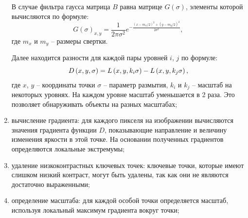 \documentclass[14pt, a4paper]{extreport}
\begin{document}
\begin{enumerate}[label={\arabic*)}]
		В случае фильтра гаусса матрица $B$ равна матрице $G(\sigma)$, элементы которой вычисляются по формуле:
		\begin{equation}
			G(\sigma)_{x,y} = \frac{1}{2\pi\sigma^2}e^{-\frac{(x-m_x/2)^2 + (y-m_y/2)^2}{2\sigma^2}}, 
			\label{eq:G(sigma)}
		\end{equation} 
		где $m_x$ и $m_y$ -- размеры свертки.
		
		Далее находится разности для каждой пары уровней $i$, $j$ по формуле:
		\vspace*{-1.1cm}
		\begin{equation*}
			D\left(x,y,\sigma \right)=L\left(x,y,k_{i}\sigma \right)-L\left(x,y,k_{j}\sigma \right),
			\label{D(x,y,sigma)}
			\vspace*{-0.5cm}
		\end{equation*}
		где $x$, $y$ -- координаты точки $\sigma$ -- параметр размытия, $k_i$ и $k_j$ -- масштаб на некоторых уровнях. На каждом уровне масштаб уменьшается в 2 раза. Это позволяет обнаруживать объекты на разных масштабах;
		
		\item вычисление градиента: для каждого пикселя на изображении вычисляются значения градиента функции $D$, показывающие направление и величину изменения яркости в этой точке. На основании полученных градиентов определяются локальные экстремумы;
		
		\item удаление низкоконтрастных ключевых точек: ключевые точки, которые имеют слишком низкий контраст, могут быть удалены, так как они не являются достаточно выраженными;
		
		\item определение масштаба: для каждой особой точки определяется масштаб, используя локальный максимум градиента вокруг точки;
		

\end{enumerate}
\end{document}
